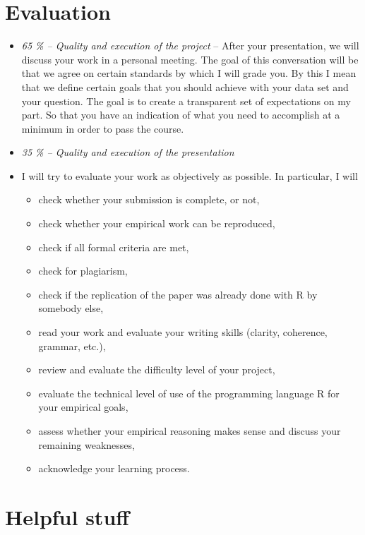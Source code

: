 \documentclass[
  12pt,
]{article}
\providecommand{\tightlist}{%
  \setlength{\itemsep}{0pt}\setlength{\parskip}{0pt}}
\begin{document}
\hypertarget{evaluation}{%
\section{Evaluation}\label{evaluation}}

\begin{itemize}
\item
  \emph{65 \% -- Quality and execution of the project}
  -- After your presentation, we will discuss your work in a personal meeting. The goal of this conversation will be that we agree on certain standards by which I will grade you. By this I mean that we define certain goals that you should achieve with your data set and your question. The goal is to create a transparent set of expectations on my part. So that you have an indication of what you need to accomplish at a minimum in order to pass the course.
\item
  \emph{35 \% -- Quality and execution of the presentation}
\item
  I will try to evaluate your work as objectively as possible. In particular, I will

  \begin{itemize}
  \tightlist
  \item
    check whether your submission is complete, or not,
  \item
    check whether your empirical work can be reproduced,
  \item
    check if all formal criteria are met,
  \item
    check for plagiarism,
  \item
    check if the replication of the paper was already done with R by somebody else,
  \item
    read your work and evaluate your writing skills (clarity, coherence, grammar, etc.),
  \item
    review and evaluate the difficulty level of your project,
  \item
    evaluate the technical level of use of the programming language R for your empirical goals,
  \item
    assess whether your empirical reasoning makes sense and discuss your remaining weaknesses,
  \item
    acknowledge your learning process.
  \end{itemize}
\end{itemize}

\hypertarget{helpful-stuff}{%
\section{Helpful stuff}\label{helpful-stuff}}
\end{document}
